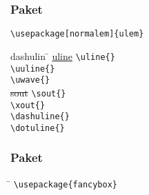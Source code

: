 \setlength{\columnseprule}{0pt}
\begin{multicols}{2}

\vspace{-2\baselineskip}
\subsubsection*{Paket }

\lstinline|\usepackage[normalem]{ulem}|

\begin{tabbing}
	dashulin	\=  \kill %
\uline{uline}					\> \lstinline|\uline{}| \\
				\> \lstinline|\uuline{}| \\
					\> \lstinline|\uwave{}| \\
\sout{sout}						\> \lstinline|\sout{}| \\
						\> \lstinline|\xout{}| \\
	\> \lstinline|\dashuline{}| \\
		\> \lstinline|\dotuline{}| \\
\end{tabbing}

\vspace{-2\baselineskip}
\columnbreak
\subsubsection*{Paket }

\begin{tabbing}
	\hspace{1ex}	\=  \kill %
	\> \lstinline|\usepackage{fancybox}|    \\
	\> \shadowbox{\lstinline|\shadowbox{}|} \\
	\> \doublebox{\lstinline|\doublebox{}|} \\
	\> \ovalbox{\lstinline|\ovalbox{}|} 		\\
	\> \Ovalbox{\lstinline|\Ovalbox{}|} 		\\
\end{tabbing}

\end{multicols}\setlength{\columnseprule}{0.5pt}

\negAbstand
